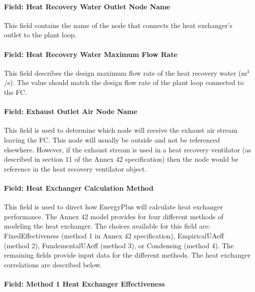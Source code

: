 \paragraph{Field: Heat Recovery Water Outlet Node Name}\label{field-heat-recovery-water-outlet-node-name-1}

This field contains the name of the node that connects the heat exchanger's outlet to the plant loop.

\paragraph{Field: Heat Recovery Water Maximum Flow Rate}\label{field-heat-recovery-water-maximum-flow-rate}

This field describes the design maximum flow rate of the heat recovery water (m\(^{3}\)/s). The value should match the design flow rate of the plant loop connected to the FC.

\paragraph{Field: Exhaust Outlet Air Node Name}\label{field-exhaust-outlet-air-node-name}

This field is used to determine which node will receive the exhaust air stream leaving the FC. This node will usually be outside and not be referenced elsewhere. However, if the exhaust stream is used in a heat recovery ventilator (as described in section 11 of the Annex 42 specification) then the node would be reference in the heat recovery ventilator object.

\paragraph{Field: Heat Exchanger Calculation Method}\label{field-heat-exchanger-calculation-method}

This field is used to direct how EnergyPlus will calculate heat exchanger performance. The Annex 42 model provides for four different methods of modeling the heat exchanger. The choices available for this field are: FixedEffectiveness (method 1 in Annex 42 specification), EmpiricalUAeff (method 2), FundementalUAeff (method 3), or Condensing (method 4). The remaining fields provide input data for the different methods. The heat exchanger correlations are described below.

\paragraph{Field: Method 1 Heat Exchanger Effectiveness}\label{field-method-1-heat-exchanger-effectiveness}

